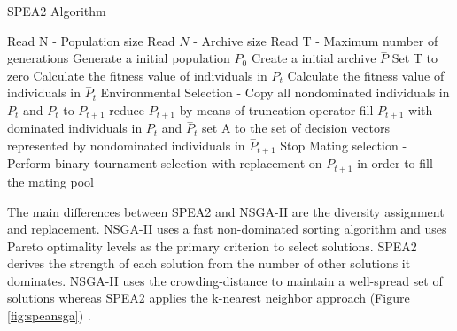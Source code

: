 \documentclass[espaco=umemeio,chapter=TITLE,twoside,openright]{abnt}
\begin{document}
\begin{algorithm}[h]
  \caption{SPEA2 Algorithm \cite{Zitzler2001}}\label{spea2}
  \begin{algorithmic}[1]

    \State Read N - Population size
    \State Read $ \overset{-}{N}$ - Archive size
    \State Read T - Maximum number of generations
    \State Generate a initial population $P_{0}$
    \State Create a initial archive $ \overset{-}{P} $
    \State Set T to zero
    \State Calculate the fitness value of individuals in $P_{t}$
    \State Calculate the fitness value of individuals in $\overset{-}{P}_{t}$
    \State Environmental Selection - Copy all nondominated individuals in $P_{t}$ and $\overset{-}{P}_{t}$  to $\overset{-}{P}_{t+1}$
    \State reduce  $\overset{-}{P}_{t+1}$ by means of truncation operator
    \State fill $\overset{-}{P}_{t+1}$ with dominated individuals in $P_{t}$ and $\overset{-}{P}_{t}$
    \EndIf
    \State set A to the set of decision vectors represented by nondominated individuals in $\overset{-}{P}_{t+1}$
    \State Stop
    \EndIf
    \State Mating selection - Perform binary tournament selection with replacement on $\overset{-}{P}_{t+1}$ in order to fill the mating pool
  \end{algorithmic}
\end{algorithm}

The main differences between SPEA2 and NSGA-II are the diversity assignment and replacement. NSGA-II uses a fast non-dominated sorting algorithm and uses Pareto optimality levels as the primary criterion to select solutions. SPEA2 derives the strength of each solution from the number of other solutions it dominates. NSGA-II uses the crowding-distance to maintain a well-spread set of solutions whereas SPEA2 applies the k-nearest neighbor approach (Figure \ref{fig:speansga}) \cite{Tervonen2017} \cite{Deb2005}.
\end{document}
